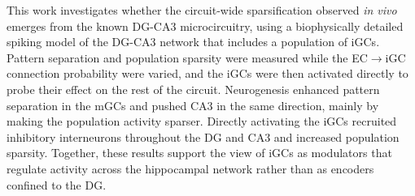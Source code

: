 This work investigates whether the circuit-wide sparsification observed \textit{in vivo}~\parencite{mchughAdultborn2022} emerges from the known DG-CA3
microcircuitry, using a biophysically detailed spiking model of the DG-CA3 network that includes a population of iGCs. Pattern
separation and population sparsity were measured while the EC$\to$iGC connection probability were varied, and the iGCs were then
activated directly to probe their effect on the rest of the circuit. Neurogenesis enhanced pattern separation in the mGCs and
pushed CA3 in the same direction, mainly by making the population activity sparser. Directly activating the iGCs recruited
inhibitory interneurons throughout the DG and CA3 and increased population sparsity. Together, these results support the view of
iGCs as modulators that regulate activity across the hippocampal network rather than as encoders confined to the DG\@.
